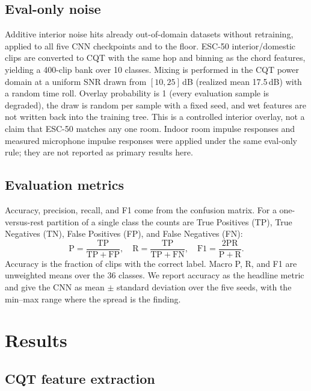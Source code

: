 \documentclass[pdflatex,sn-mathphys-num,iicol]{sn-jnl}
\theoremstyle{thmstyleone}
\theoremstyle{thmstyletwo}
\theoremstyle{thmstylethree}
\begin{document}
\subsection{Eval-only noise}\label{subsec3_7}

Additive interior noise hits already out-of-domain datasets without retraining, applied to all five CNN checkpoints and to the floor. ESC-50 interior/domestic clips \cite{Piczak2015} are converted to CQT with the same hop and binning as the chord features, yielding a 400-clip bank over 10 classes. Mixing is performed in the CQT power domain at a uniform SNR drawn from $[10, 25]$\,dB (realized mean 17.5\,dB) with a random time roll. Overlay probability is 1 (every evaluation sample is degraded), the draw is random per sample with a fixed seed, and wet features are not written back into the training tree. This is a controlled interior overlay, not a claim that ESC-50 matches any one room. Indoor room impulse responses and measured microphone impulse responses were applied under the same eval-only rule; they are not reported as primary results here.

\subsection{Evaluation metrics}\label{subsec3_6}

Accuracy, precision, recall, and F1 come from the confusion matrix. For a one-versus-rest partition of a single class the counts are True Positives (TP), True Negatives (TN), False Positives (FP), and False Negatives (FN):
\begin{equation}
\mathrm{P}=\frac{\mathrm{TP}}{\mathrm{TP}+\mathrm{FP}},\quad
\mathrm{R}=\frac{\mathrm{TP}}{\mathrm{TP}+\mathrm{FN}},\quad
\mathrm{F1}=\frac{2\mathrm{PR}}{\mathrm{P}+\mathrm{R}}.
\label{eq:prf}
\end{equation}
Accuracy is the fraction of clips with the correct label. Macro P, R, and F1 are unweighted means over the 36 classes. We report accuracy as the headline metric and give the CNN as mean $\pm$ standard deviation over the five seeds, with the min--max range where the spread is the finding.

\section{Results}\label{sec4}

\subsection{CQT feature extraction}\label{subsec4_1}
\end{document}
